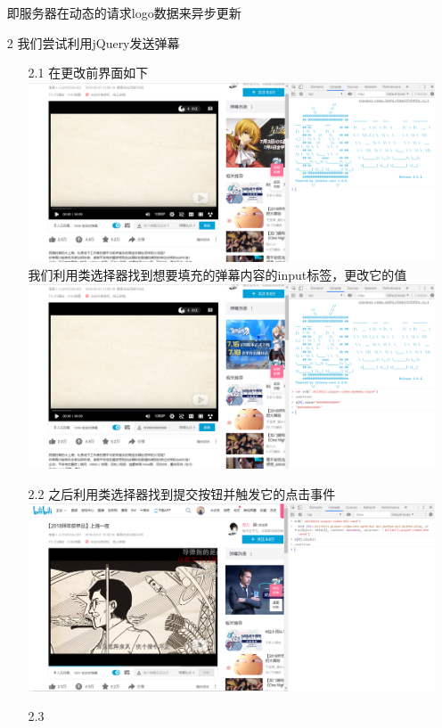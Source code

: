 \documentclass[UTF8]{ctexart}
\begin{document}
\begin{enumerate}
        即服务器在动态的请求logo数据来异步更新
        \item[2] 
        我们尝试利用jQuery发送弹幕
        \begin{enumerate}
            \item[2.1]
            在更改前界面如下\\ 
            \includegraphics[scale=0.3]{06-27_3.png}
            我们利用类选择器找到想要填充的弹幕内容的input标签，更改它的值\\
            \includegraphics[scale=0.3]{06-27_4.png}
            \item[2.2] 
            之后利用类选择器找到提交按钮并触发它的点击事件\\
            \includegraphics[scale=0.3]{06-27_5.png}
            \item[2.3] 

\end{enumerate}
\end{enumerate}
\end{document}
